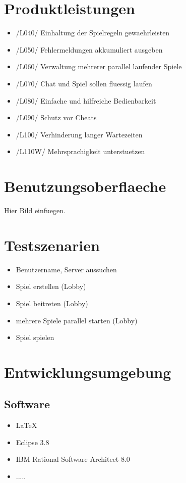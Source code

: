 \documentclass{article}
\begin{document}
\section{Produktleistungen}
\begin{itemize}
	\item /L040/ Einhaltung der Spielregeln gewaehrleisten
	\item /L050/ Fehlermeldungen akkumuliert ausgeben
	\item /L060/ Verwaltung mehrerer parallel laufender Spiele
	\item /L070/ Chat und Spiel sollen fluessig laufen
	\item /L080/ Einfache und hilfreiche Bedienbarkeit
	\item /L090/ Schutz vor Cheats
	\item /L100/ Verhinderung langer Wartezeiten
	\item /L110W/ Mehrsprachigkeit unterstuetzen
\end{itemize}

\section{Benutzungsoberflaeche}
Hier Bild einfuegen.

\section{Testszenarien}
\begin{itemize}
	\item Benutzername, Server aussuchen
	\item Spiel erstellen (Lobby)
	\item Spiel beitreten (Lobby)
	\item mehrere Spiele parallel starten (Lobby)
	\item Spiel spielen 
\end{itemize}

\section{Entwicklungsumgebung}
\subsection{Software}
\begin{itemize}
	\item LaTeX
	\item Eclipse 3.8
	\item IBM Rational Software Architect 8.0
	\item .....
\end{itemize}
\end{document}
